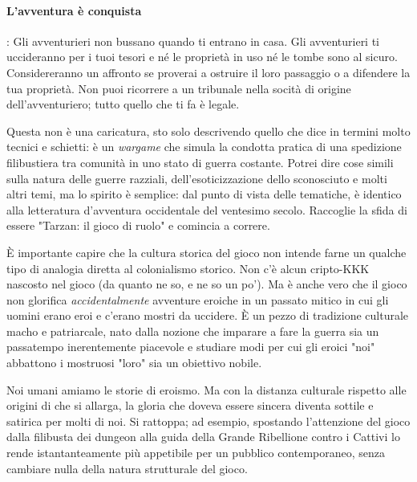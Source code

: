 \paragraph{L'avventura è conquista}: Gli avventurieri non bussano quando ti entrano in casa. Gli avventurieri ti uccideranno per i tuoi tesori e né le proprietà in uso né le tombe sono al sicuro. Considereranno un affronto se proverai a ostruire il loro passaggio o a difendere la tua proprietà. Non puoi ricorrere a un tribunale nella socità di origine dell'avventuriero; tutto quello che ti fa è legale.

Questa non è una caricatura, sto solo descrivendo quello che dice \dnd{} in termini molto tecnici e schietti: è un \textit{wargame} che simula la condotta pratica di una spedizione filibustiera tra comunità in uno stato di guerra costante. Potrei dire cose simili sulla natura delle guerre razziali, dell'esoticizzazione dello sconosciuto e molti altri temi, ma lo spirito è semplice: dal punto di vista delle tematiche, \dnd{} è identico alla letteratura d'avventura occidentale del ventesimo secolo. Raccoglie la sfida di essere "Tarzan: il gioco di ruolo" e comincia a correre.

È importante capire che la cultura storica del gioco non intende farne un qualche tipo di analogia diretta al colonialismo storico. Non c'è alcun cripto-KKK nascosto nel gioco (da quanto ne so, e ne so un po'). Ma è anche vero che il gioco non glorifica \textit{accidentalmente} avventure eroiche in un passato mitico in cui gli uomini erano eroi e c'erano mostri da uccidere. È un pezzo di tradizione culturale macho e patriarcale, nato dalla nozione che imparare a fare la guerra sia un passatempo inerentemente piacevole e studiare modi per cui gli eroici "noi" abbattono i mostruosi "loro" sia un obiettivo nobile.

Noi umani amiamo le storie di eroismo. Ma con la distanza culturale rispetto alle origini di \dnd che si allarga, la gloria che doveva essere sincera diventa sottile e satirica per molti di noi. Si rattoppa; ad esempio, spostando l'attenzione del gioco dalla filibusta dei dungeon alla guida della Grande Ribellione contro i Cattivi lo rende istantanteamente più appetibile per un pubblico contemporaneo, senza cambiare nulla della natura strutturale del gioco.

